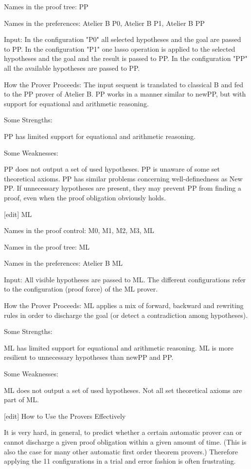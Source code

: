 Names in the proof tree: PP

Names in the preferences: Atelier B P0, Atelier B P1, Atelier B PP

Input: In the configuration "P0" all selected hypotheses and the goal are passed to PP. In the configuration "P1" one lasso operation is applied to the selected hypotheses and the goal and the result is passed to PP. In the configuration "PP" all the available hypotheses are passed to PP.

How the Prover Proceeds: The input sequent is translated to classical B and fed to the PP prover of Atelier B. PP works in a manner similar to newPP, but with support for equational and arithmetic reasoning.

Some Strengths:

    PP has limited support for equational and arithmetic reasoning. 

Some Weaknesses:

    PP does not output a set of used hypotheses.
    PP is unaware of some set theoretical axioms.
    PP has similar problems concerning well-definedness as New PP.
    If unnecessary hypotheses are present, they may prevent PP from finding a proof, even when the proof obligation obviously holds. 

[edit] ML

Names in the proof control: M0, M1, M2, M3, ML

Names in the proof tree: ML

Names in the preferences: Atelier B ML

Input: All visible hypotheses are passed to ML. The different configurations refer to the configuration (proof force) of the ML prover.

How the Prover Proceeds: ML applies a mix of forward, backward and rewriting rules in order to discharge the goal (or detect a contradiction among hypotheses).

Some Strengths:

    ML has limited support for equational and arithmetic reasoning.
    ML is more resilient to unnecessary hypotheses than newPP and PP. 

Some Weaknesses:

    ML does not output a set of used hypotheses.
    Not all set theoretical axioms are part of ML. 

[edit] How to Use the Provers Effectively

It is very hard, in general, to predict whether a certain automatic prover can or cannot discharge a given proof obligation within a given amount of time. (This is also the case for many other automatic first order theorem provers.) Therefore applying the 11 configurations in a trial and error fashion is often frustrating.

